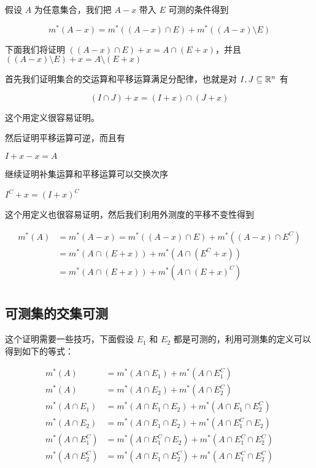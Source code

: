 假设 $A $ 为任意集合，我们把 $A-x$ 带入 $E$ 可测的条件得到

\[
m^*(A-x) = m^*((A-x) \cap E) + m^*((A-x) \setminus E)
\]

下面我们将证明 $((A-x) \cap E) + x = A \cap (E +x)$，并且 $((A-x) \setminus E) + x = A \setminus (E + x)$

首先我们证明集合的交运算和平移运算满足分配律，也就是对 $I, J \subseteq \mathbb{R}^n$ 有
 
\[
(I \cap J) + x = (I + x) \cap (J + x)
\]

这个用定义很容易证明。


然后证明平移运算可逆，而且有

$I + x - x = A$

继续证明补集运算和平移运算可以交换次序

$I^C +x = (I+x)^C$

这个用定义也很容易证明，然后我们利用外测度的平移不变性得到

\begin{align*}
m^*(A) &= m^*(A-x) = m^*((A-x) \cap E) + m^*((A-x) \cap E^C) \\
&= m^*(A \cap (E+x)) + m^*(A \cap (E^C + x)) \\
&= m^*(A \cap (E+x)) + m^*(A \cap (E+x)^C) \\
\end{align*}

\subsection{可测集的交集可测}

这个证明需要一些技巧，下面假设 $E_1$ 和 $E_2$ 都是可测的，利用可测集的定义可以得到如下的等式：

\begin{align*}
    m^*(A) & = m^*(A \cap E_1) + m^*(A \cap E_1^C) \\ 
    m^*(A) & = m^*(A \cap E_2) + m^*(A \cap E_2^C) \\ 
    m^*(A \cap E_1) & = m^*(A \cap E_1 \cap E_2) + m^*(A \cap E_1 \cap E_2^{C}) \\ 
    m^*(A \cap E_2) & = m^*(A \cap E_1 \cap E_2) + m^*(A \cap E_1^{C} \cap E_2) \\ 
    m^*(A \cap E_1^C) & = m^*(A \cap E_1^C \cap E_2) + m^*(A \cap E_1^C \cap E_2^{C}) \\ 
    m^*(A \cap E_2^C) & = m^*(A \cap E_1 \cap E_2^C) + m^*(A \cap E_1^{C} \cap E_2^C) \\ 
\end{align*}

